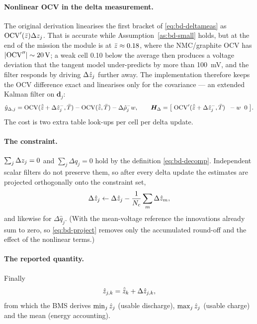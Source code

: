 \paragraph{Nonlinear OCV in the delta measurement.} The original derivation linearises the first
bracket of \eqref{eq:bd-deltameas} as $\mathrm{OCV}'(\bar{z})\Delta z_j$. That is accurate while
Assumption~\ref{as:bd-small} holds, but at the end of the mission the module is at
$\bar{z}\approx\num{0.18}$, where the NMC/graphite OCV has $|\mathrm{OCV}''|\sim\SI{20}{\volt}$; a weak
cell \num{0.10} below the average then produces a voltage deviation that the tangent model
under-predicts by more than \SI{100}{\milli\volt}, and the filter responds by driving
$\Delta\hat{z}_j$ further away. The implementation therefore keeps the OCV difference exact and
linearises only for the covariance --- an extended Kalman filter on $\bm{d}_j$:
\begin{equation}
\hat y_{\Delta,j} = \mathrm{OCV}(\hat{\bar{z}}+\Delta\hat{z}_j^-,\bar T) - \mathrm{OCV}(\hat{\bar{z}},\bar T) - \Delta\hat\rho_j^- w,
\qquad
\bm{H}_\Delta = \big[\;\mathrm{OCV}'(\hat{\bar{z}}+\Delta\hat{z}_j^-,\bar T)\;\; -w\;\; 0\;\big].
\label{eq:bd-deltaH}
\end{equation}
The cost is two extra table look-ups per cell per delta update.

\paragraph{The constraint.} $\sum_j\Delta z_j = 0$ and $\sum_j\Delta q_j=0$ hold by the
definition \eqref{eq:bd-decomp}. Independent scalar filters do not preserve them, so after every
delta update the estimates are projected orthogonally onto the constraint set,
\begin{equation}
\Delta\hat{z}_j \leftarrow \Delta\hat{z}_j - \frac1{N_c}\sum_m \Delta\hat{z}_m ,
\label{eq:bd-project}
\end{equation}
and likewise for $\Delta\hat q_j$. (With the mean-voltage reference the innovations already sum to
zero, so \eqref{eq:bd-project} removes only the accumulated round-off and the effect of the
nonlinear terms.)

\paragraph{The reported quantity.} Finally
\begin{equation}
\hat{z}_{j,k} = \hat{\bar{z}}_k + \Delta\hat{z}_{j,k},
\label{eq:bd-out}
\end{equation}
from which the BMS derives $\min_j\hat{z}_j$ (usable discharge), $\max_j\hat{z}_j$ (usable
charge) and the mean (energy accounting).

